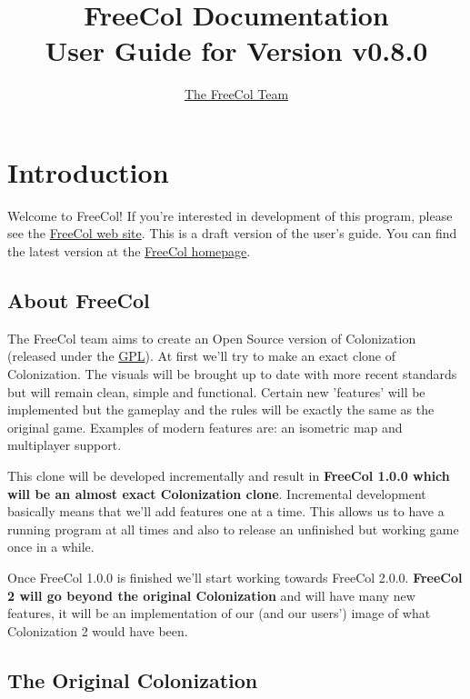 \documentclass[12pt]{book}
\begin{document}
\author{\href{http://freecol.sourceforge.net/index.php?section=8}{The FreeCol Team}}
\title{FreeCol Documentation\\User Guide for Version v0.8.0}
\maketitle{}

\tableofcontents
\newpage


\hypertarget{Introduction}{\chapter{Introduction}}

Welcome to FreeCol! If you're interested in development of this
program, please see the \href{http://freecol.sourceforge.net}{FreeCol
web site}. This is a draft version of the user's guide. You can find
the latest version at the
\href{http://freecol.sourceforge.net}{FreeCol homepage}.

\hypertarget{About FreeCol}{\section{About FreeCol}}

The FreeCol team aims to create an Open Source version of
Colonization (released under the
\href{http://www.gnu.org/licenses/gpl.html}{GPL}). At
first we'll try to make an exact clone of Colonization. The visuals
will be brought up to date with more recent standards but will remain
clean, simple and functional. Certain new 'features' will be
implemented but the gameplay and the rules will be exactly the same as
the original game. Examples of modern features are: an isometric map
and multiplayer support.

This clone will be developed incrementally and result in
\textbf{FreeCol 1.0.0 which will be an almost exact Colonization
clone}. Incremental development basically means that we'll add
features one at a time. This allows us to have a running program at
all times and also to release an unfinished but working game once in a
while.

Once FreeCol 1.0.0 is finished we'll start working towards FreeCol
2.0.0. \textbf{FreeCol 2 will go beyond the original Colonization} and
will have many new features, it will be an implementation of our (and
our users') image of what Colonization 2 would have been.


\hypertarget{The Original Colonization}{\section{The Original Colonization}}
\end{document}
